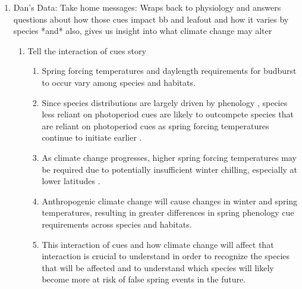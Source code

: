 \documentclass{article}\usepackage[]{graphicx}\usepackage[]{color}
\begin{document}
\begin{enumerate}
\item Dan's Data: Take home messages: Wraps back to physiology and answers questions about how those cues impact bb and leafout and how it varies by species *and* also, gives us insight into what climate change may alter
\begin{enumerate}
\item Tell the interaction of cues story
\begin{enumerate}
\item Spring forcing temperatures and daylength requirements for budburst to occur vary among species and habitats.
\item Since species distributions are largely driven by phenology \citep{Chuine2001}, species less reliant on photoperiod cues are likely to outcompete species that are reliant on photoperiod cues as spring forcing temperatures continue to initiate earlier \citep{Vitasse2011, Gauzere2017}.
\item As climate change progresses, higher spring forcing temperatures may be required due to potentially insufficient winter chilling, especially at lower latitudes \citep{McCreary1990, Morin2009, Fu2012, Polgar2014, Chuine2010}. 
\item Anthropogenic climate change will cause changes in winter and spring temperatures, resulting in greater differences in spring phenology cue requirements across species and habitats. 
\item This interaction of cues and how climate change will affect that interaction is crucial to understand in order to recognize the species that will be affected and to understand which species will likely become more at risk of false spring events in the future. 

\end{enumerate}



\end{enumerate}
\end{enumerate}
\end{document}
